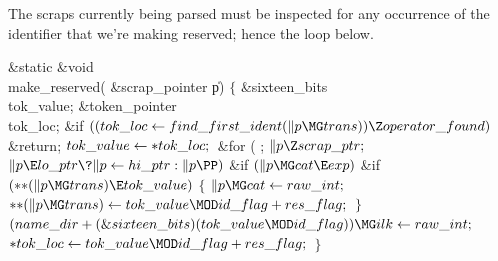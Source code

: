 The scraps currently being parsed must be inspected for any
occurrence of the identifier that we're making reserved; hence
the  loop below.

\Y\B\1\1\&{static} \&{void} \\{make\_reserved}(\6
\&{scrap\_pointer} \|p)\2\2\6
${}\{{}$\1\6
\&{sixteen\_bits} \\{tok\_value};\6
\&{token\_pointer} \\{tok\_loc};\7
\&{if} ${}((\\{tok\_loc}\K\\{find\_first\_ident}(\|p\MG\\{trans}))\Z\\{operator%
\_found}){}$\1\5
\&{return};\2\6
${}\\{tok\_value}\leftarrow{*}\\{tok\_loc};{}$\6
\&{for} ( ; ${}\|p\Z\\{scrap\_ptr};{}$ ${}\|p\E\\{lo\_ptr}\?\|p\K\\{hi\_ptr}:%
\|p\PP){}$\1\6
\&{if} ${}(\|p\MG\\{cat}\E\\{exp}){}$\1\6
\&{if} ${}({*}{*}(\|p\MG\\{trans})\E\\{tok\_value}){}$\5
${}\{{}$\1\6
${}\|p\MG\\{cat}\K\\{raw\_int};{}$\6
${}{*}{*}(\|p\MG\\{trans})\K\\{tok\_value}\MOD\\{id\_flag}+\\{res\_flag};{}$\6
\4${}\}{}$\2\2\2\6
${}(\\{name\_dir}+(\&{sixteen\_bits})(\\{tok\_value}\MOD\\{id\_flag}))\MG%
\\{ilk}\K\\{raw\_int};{}$\6
${}{*}\\{tok\_loc}\K\\{tok\_value}\MOD\\{id\_flag}+\\{res\_flag};{}$\6
\4${}\}{}$\2\par
\fi

